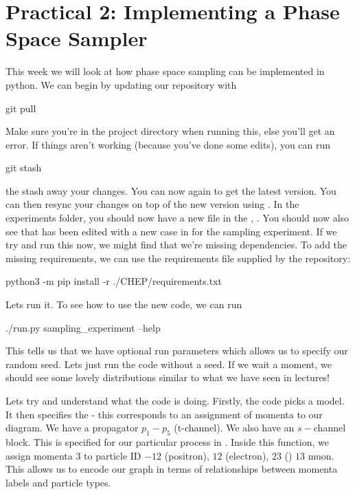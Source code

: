 \section*{Practical 2: Implementing a Phase Space Sampler}

This week we will look at how phase space sampling can be implemented in python. We can begin by updating our repository with 
\begin{codeenv}
    git pull
\end{codeenv}
Make sure you're in the project directory when running this, else you'll get an error. If things aren't working (because you've done some edits), you can run
\begin{codeenv}
    git stash
\end{codeenv}
the stash away your changes. You can now  again to get the latest version. You can then resync your changes on top of the new version using .
In the experiments folder, you should now have a new file in the , .
You should now also see that  has been edited with a new case in  for the sampling experiment. If we try and run this now, we might find that we're missing dependencies. To add the missing requirements, we can use the requirements file supplied by the repository:
\begin{codeenv}
    python3 -m pip install -r ./CHEP/requirements.txt
\end{codeenv}
Lets run it. To see how to use the new code, we can run
\begin{codeenv}
    ./run.py sampling_experiment --help
\end{codeenv}
This tells us that we have optional run parameters which allows us to specify our random seed. Lets just run the code without a seed. If we wait a moment, we should see some lovely distributions similar to what we have seen in lectures!

Lets try and understand what the code is doing. Firstly, the code picks a model. It then specifies the  - this corresponds to an assignment of momenta to our diagram. We have a propagator $p_1-p_5$ (t-channel). We also have an $s-$channel block. This is specified for our particular process in . Inside this function,  we assign momenta 3 to particle ID $-12$ (positron), $12$ (electron), $23$ ()
$13$ muon. This allows us to encode our graph in terms of relationships between momenta labels and particle types.

